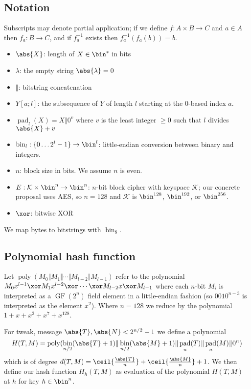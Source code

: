\documentclass[letterpaper,11pt]{article}
\newcommand*{\Concat}{\Vert}
\DeclareMathOperator{\fromint}{bin}
\DeclareMathOperator{\GF}{GF}
\DeclareMathOperator{\pad}{pad}
\DeclareMathOperator{\poly}{poly}
\begin{document}
\subsection{Notation}
Subscripts may denote partial application; if we define $f: A \times B \rightarrow C$ and
$a \in A$ then $f_a: B \rightarrow C$, and if $f_a^{-1}$ exists then $f_a^{-1}(f_a(b)) = b$.
\begin{itemize}
    \item $\abs{X}$: length of $X \in \bin^{*}$ in bits
    \item $\lambda$: the empty string $\abs{\lambda} = 0$
    \item $\Concat$: bitstring concatenation
    \item $Y[a;l]$: the subsequence of $Y$ of length $l$ starting at the 0-based index $a$.
    \item $\pad_l(X) = X \Concat 0^v$
    where $v$ is the least integer $\geq 0$ such that $l$ divides $\abs{X} + v$
    \item 
    $\fromint_l: \{0 \ldots 2^l-1\} \rightarrow \bin^l$:
    little-endian conversion between binary and integers.
    \item \(n\): block size in bits. We assume \(n\) is even.
    \item \(E: \mathcal{K} \times \bin^n \rightarrow \bin^n\): 
    \(n\)-bit block cipher with keyspace \(\mathcal{K}\);
    our concrete proposal uses AES, so \(n=128\) and \(\mathcal{K}\) is
    \(\bin^{128}\), \(\bin^{192}\), or \(\bin^{256}\). 
    \item \(\xor\): bitwise XOR
\end{itemize}
We map bytes to bitstrings with \(\fromint_8\).

\subsection{Polynomial hash function}

Let \(\poly(M_0 \Concat M_1 \Concat \cdots \Concat M_{l-2} \Concat M_{l-1})\)
refer to the polynomial
\(M_0x^{l-1} \xor M_1x^{l-2} \xor \cdots \xor M_{l-2}x \xor M_{l-1}\)
where each \(n\)-bit \(M_i\) is interpreted as a \(\GF(2^n)\)
field element in a little-endian fashion
(so \(0010^{n-3}\) is interpreted as the element \(x^2\)).
Where \(n=128\) we reduce by the polynomial
\(1 + x + x^2 + x^7 + x^{128}\).

For tweak, message \(\abs{T}, \abs{N} < 2^{n/2} -1\) we define a polynomial
\begin{displaymath}
    H(T, M) = \poly(\fromint_{n/2}(\abs{T} + 1) \Concat \fromint_{n/2}(\abs{M} + 1) \Concat \pad_n(T) \Concat \pad_n(M) \Concat 0^n)
\end{displaymath}
which is of degree
\(d(T, M) = \ceil{\frac{\abs{T}}{n}} + \ceil{\frac{\abs{M}}{n}} + 1\).
We then define our hash function \(H_h(T, M)\) as evaluation
of the polynomial \(H(T, M)\) at \(h\) for key \(h \in \bin^n\).
\end{document}
